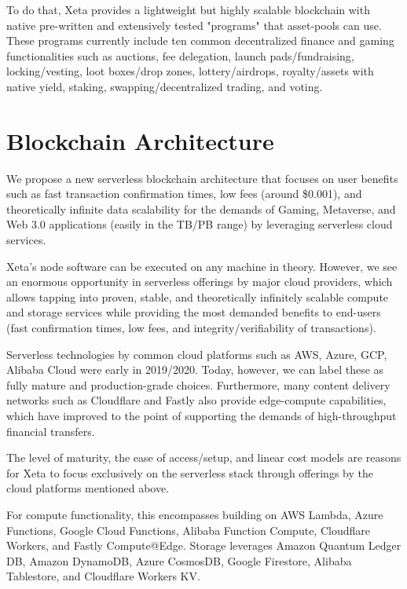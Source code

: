 \documentclass{article}
\begin{document}
To do that, Xeta provides a lightweight but highly scalable blockchain with native pre-written and extensively tested "programs" that asset-pools can use. These programs currently include ten common decentralized finance and gaming functionalities such as auctions, fee delegation, launch pads/fundraising, locking/vesting, loot boxes/drop zones, lottery/airdrops, royalty/assets with native yield, staking, swapping/decentralized trading, and voting.

\section{Blockchain Architecture}

We propose a new serverless blockchain architecture that focuses on user benefits such as fast transaction confirmation times, low fees (around \$0.001), and theoretically infinite data scalability for the demands of Gaming, Metaverse, and Web 3.0 applications (easily in the TB/PB range) by leveraging serverless cloud services.
\bigskip

Xeta's node software can be executed on any machine in theory. However, we see an enormous opportunity in serverless offerings by major cloud providers, which allows tapping into proven, stable, and theoretically infinitely scalable compute and storage services while providing the most demanded benefits to end-users (fast confirmation times, low fees, and integrity/verifiability of transactions).
\bigskip

Serverless technologies by common cloud platforms such as AWS, Azure, GCP, Alibaba Cloud were early in 2019/2020. Today, however, we can label these as fully mature and production-grade choices. Furthermore, many content delivery networks such as Cloudflare and Fastly also provide edge-compute capabilities, which have improved to the point of supporting the demands of high-throughput financial transfers.
\bigskip

The level of maturity, the ease of access/setup, and linear cost models are reasons for Xeta to focus exclusively on the serverless stack through offerings by the cloud platforms mentioned above.
\bigskip

For compute functionality, this encompasses building on AWS Lambda, Azure Functions, Google Cloud Functions, Alibaba Function Compute, Cloudflare Workers, and Fastly Compute@Edge. Storage leverages Amazon Quantum Ledger DB, Amazon DynamoDB, Azure CosmosDB, Google Firestore, Alibaba Tablestore, and Cloudflare Workers KV.
\bigskip
\end{document}
